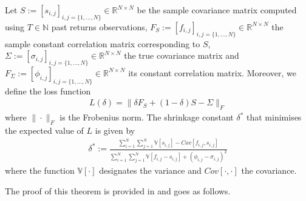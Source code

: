     	\begin{theorem}\label{optimalshrinkageconstantheorem}
    	        Let $S := [s_{i,j}]_{i,j= \{1, \dots, N \}} \in \mathbb{R}^{N \times N}$ be the sample covariance matrix computed using $T \in \mathbb{N}$ past returns observations, $F_S := [f_{i,j}]_{i,j= \{1, \dots, N \}} \in \mathbb{R}^{N \times N}$ the sample constant correlation matrix corresponding to $S$, $\Sigma := [\sigma_{i,j}]_{i,j= \{1, \dots, N \}} \in \mathbb{R}^{N \times N}$ the true covariance matrix and $F_\Sigma := [\phi_{i,j}]_{i,j= \{1, \dots, N \}} \in \mathbb{R}^{N \times N}$ its constant correlation matrix. Moreover, we define the loss function
    	        \begin{align*}
    	            L(\delta) = \| \delta F_S + (1-\delta) S - \Sigma \|_F
    	        \end{align*}
    	        where $\| \cdot \|_F$ is the Frobenius norm. The shrinkage constant $\delta^*$ that minimises the expected value of $L$ is given by
    	        \begin{align}\label{optimalshrinkageconstant}
    	            \delta^* := \frac{\sum_{i=1}^N \sum_{j=1}^N \mathbb{V}[s_{i,j}] - Cov[f_{i,j}, s_{i,j}]}{\sum_{i=1}^N \sum_{j=1}^N \mathbb{V}[f_{i,j} - s_{i,j}] + (\phi_{i,j} - \sigma_{i,j})^2}
    	        \end{align}
    	        where the function $\mathbb{V}[\cdot]$ designates the variance and $Cov[\cdot, \cdot]$ the covariance.
    	\end{theorem}
    	
    	The proof of this theorem is provided in \cite{ledoit2003} and goes as follows.
    	

